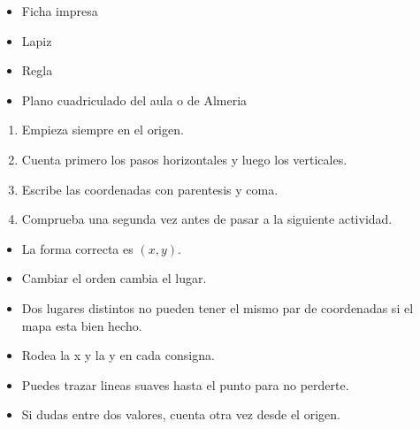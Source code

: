 \documentclass[12pt,a4paper]{article}
\begin{document}
        \FichaCabecera

        \begin{materialesbox}
        \begin{itemize}
    \item Ficha impresa
    \item Lapiz
    \item Regla
    \item Plano cuadriculado del aula o de Almeria
\end{itemize}
        \end{materialesbox}

        \begin{pasosbox}
        \begin{enumerate}
    \item Empieza siempre en el origen.
    \item Cuenta primero los pasos horizontales y luego los verticales.
    \item Escribe las coordenadas con parentesis y coma.
    \item Comprueba una segunda vez antes de pasar a la siguiente actividad.
\end{enumerate}
        \end{pasosbox}

        \begin{recordatoriobox}
        \begin{itemize}
    \item La forma correcta es $(x,y)$.
    \item Cambiar el orden cambia el lugar.
    \item Dos lugares distintos no pueden tener el mismo par de coordenadas si el mapa esta bien hecho.
\end{itemize}
        \end{recordatoriobox}

        \begin{apoyobox}
        \begin{itemize}
    \item Rodea la x y la y en cada consigna.
    \item Puedes trazar lineas suaves hasta el punto para no perderte.
    \item Si dudas entre dos valores, cuenta otra vez desde el origen.
\end{itemize}
        \end{apoyobox}

\end{document}
